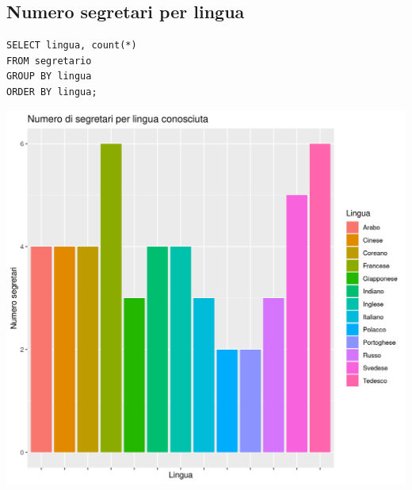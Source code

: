 \documentclass{article}
\begin{document}
\subsection{Numero segretari per lingua}
\begin{verbatim}
SELECT lingua, count(*) 
FROM segretario 
GROUP BY lingua 
ORDER BY lingua;
\end{verbatim}
\begin{center}
\includegraphics[width=\textwidth]{plot_numero_segretari_lingua.png}
\end{center}

\newpage
\end{document}
